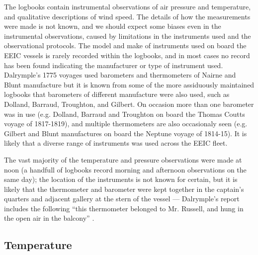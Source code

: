 \documentclass[CP]{copernicus}
\begin{document}
The logbooks contain instrumental observations of air pressure and temperature, and qualitative descriptions of wind speed. The details of how the measurements were made is not known, and we should expect some biases even in the instrumental observations, caused by limitations in the instruments used and the observational protocols. The model and make of instruments used on board the EEIC vessels is rarely recorded within the logbooks, and in most cases no record has been found indicating the manufacturer or type of instrument used. Dalrymple's 1775 voyages used barometers and thermometers of Nairne and Blunt manufacture \citep{Dalrymple78} but it is known from some of the more assiduously maintained logbooks that barometers of different manufacture were also used, such as Dolland, Barraud, Troughton, and Gilbert. On occasion more than one barometer was in use (e.g. Dolland, Barraud and Troughton on board the Thomas Coutts voyage of 1817-1819), and multiple thermometers are also occasionaly seen (e.g. Gilbert and Blunt manufactures on board the Neptune voyage of 1814-15). It is likely that a diverse range of instruments was used across the EEIC fleet.

 The vast majority of the temperature and pressure observations were made at noon (a handfull of logbooks record morning and afternoon observations on the same day); the location of the instruments is not known for certain, but it is likely that the thermometer and barometer were kept together in the captain's quarters and adjacent gallery at the stern of the vessel --- Dalrymple's report includes the following ``this thermometer belonged to Mr. Russell, and hung in the open air in the balcony'' \citep{Dalrymple78}.

\subsection{Temperature}
\end{document}
